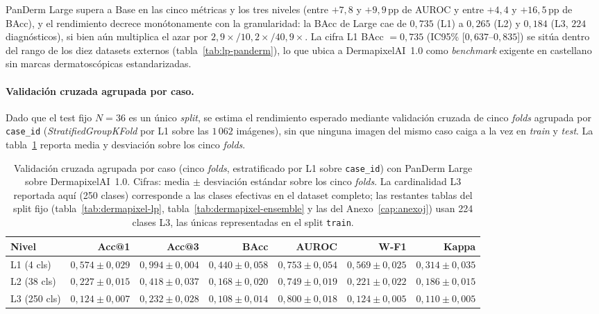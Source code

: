 PanDerm Large supera a Base en las cinco métricas y los tres niveles
(entre $+7{,}8$ y $+9{,}9$\,pp de AUROC y entre $+4{,}4$ y
$+16{,}5$\,pp de BAcc), y el rendimiento decrece monótonamente con la
granularidad: la BAcc de Large cae de $0{,}735$ (L1) a $0{,}265$ (L2)
y $0{,}184$ (L3, $224$ diagnósticos), si bien aún multiplica el azar
por $2{,}9\times / 10{,}2\times / 40{,}9\times$. La cifra L1
BAcc $= 0{,}735$ (IC95\% [$0{,}637$--$0{,}835$]) se sitúa dentro del
rango de los diez datasets externos (tabla~\ref{tab:lp-panderm}), lo
que ubica a DermapixelAI~1.0 como \emph{benchmark} exigente en
castellano sin marcas dermatoscópicas estandarizadas.


\paragraph{Validación cruzada agrupada por caso.}
Dado que el test fijo $N = 36$ es un único \emph{split}, se estima el
rendimiento esperado mediante validación cruzada de cinco \emph{folds}
agrupada por \texttt{case\_id} (\emph{StratifiedGroupKFold} por L1
sobre las $1\,062$ imágenes), sin que ninguna imagen del mismo caso
caiga a la vez en \emph{train} y \emph{test}. La
tabla~\ref{tab:dermapixel-cv} reporta media y desviación sobre los
cinco \emph{folds}.

\begin{table}[H]
\centering
\footnotesize
\setlength{\tabcolsep}{4pt}
\renewcommand{\arraystretch}{0.95}
\caption{Validación cruzada agrupada por caso (cinco \emph{folds},
estratificado por L1 sobre \texttt{case\_id}) con PanDerm Large
sobre DermapixelAI~1.0. Cifras: media $\pm$ desviación estándar
sobre los cinco \emph{folds}. La cardinalidad L3 reportada aquí
(250 clases) corresponde a las clases efectivas en el dataset
completo; las restantes tablas del split fijo
(tabla~\ref{tab:dermapixel-lp}, tabla~\ref{tab:dermapixel-ensemble}
y las del Anexo~\ref{cap:anexoj}) usan 224 clases L3, las
únicas representadas en el split \texttt{train}.}
\label{tab:dermapixel-cv}
\begin{tabular}{lrrrrrr}
\hline
Nivel           & Acc@1                 & Acc@3                 & BAcc                  & AUROC                 & W-F1                  & Kappa \\
\hline
L1 (4 cls)      & $0{,}574 \pm 0{,}029$ & $0{,}994 \pm 0{,}004$ & $0{,}440 \pm 0{,}058$ & $0{,}753 \pm 0{,}054$ & $0{,}569 \pm 0{,}025$ & $0{,}314 \pm 0{,}035$ \\
L2 (38 cls)     & $0{,}227 \pm 0{,}015$ & $0{,}418 \pm 0{,}037$ & $0{,}168 \pm 0{,}020$ & $0{,}749 \pm 0{,}019$ & $0{,}221 \pm 0{,}022$ & $0{,}186 \pm 0{,}015$ \\
L3 (250 cls)    & $0{,}124 \pm 0{,}007$ & $0{,}232 \pm 0{,}028$ & $0{,}108 \pm 0{,}014$ & $0{,}800 \pm 0{,}018$ & $0{,}124 \pm 0{,}005$ & $0{,}110 \pm 0{,}005$ \\
\hline
\end{tabular}
\end{table}

